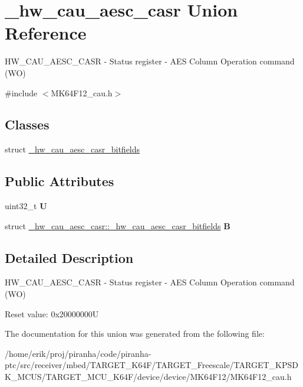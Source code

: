 \hypertarget{union__hw__cau__aesc__casr}{}\section{\+\_\+hw\+\_\+cau\+\_\+aesc\+\_\+casr Union Reference}
\label{union__hw__cau__aesc__casr}


H\+W\+\_\+\+C\+A\+U\+\_\+\+A\+E\+S\+C\+\_\+\+C\+A\+SR -\/ Status register -\/ A\+ES Column Operation command (WO)  




{\ttfamily \#include $<$M\+K64\+F12\+\_\+cau.\+h$>$}

\subsection*{Classes}
\begin{DoxyCompactItemize}
\item 
struct \hyperlink{struct__hw__cau__aesc__casr_1_1__hw__cau__aesc__casr__bitfields}{\+\_\+hw\+\_\+cau\+\_\+aesc\+\_\+casr\+\_\+bitfields}
\end{DoxyCompactItemize}
\subsection*{Public Attributes}
\begin{DoxyCompactItemize}
\item 
uint32\+\_\+t {\bfseries U}\hypertarget{union__hw__cau__aesc__casr_a70bdc55c3e888d7e8799d371283fb65f}{}\label{union__hw__cau__aesc__casr_a70bdc55c3e888d7e8799d371283fb65f}

\item 
struct \hyperlink{struct__hw__cau__aesc__casr_1_1__hw__cau__aesc__casr__bitfields}{\+\_\+hw\+\_\+cau\+\_\+aesc\+\_\+casr\+::\+\_\+hw\+\_\+cau\+\_\+aesc\+\_\+casr\+\_\+bitfields} {\bfseries B}\hypertarget{union__hw__cau__aesc__casr_a8c7dfcf4619366c8be5b47afdc1adeca}{}\label{union__hw__cau__aesc__casr_a8c7dfcf4619366c8be5b47afdc1adeca}

\end{DoxyCompactItemize}


\subsection{Detailed Description}
H\+W\+\_\+\+C\+A\+U\+\_\+\+A\+E\+S\+C\+\_\+\+C\+A\+SR -\/ Status register -\/ A\+ES Column Operation command (WO) 

Reset value\+: 0x20000000U 

The documentation for this union was generated from the following file\+:\begin{DoxyCompactItemize}
\item 
/home/erik/proj/piranha/code/piranha-\/ptc/src/receiver/mbed/\+T\+A\+R\+G\+E\+T\+\_\+\+K64\+F/\+T\+A\+R\+G\+E\+T\+\_\+\+Freescale/\+T\+A\+R\+G\+E\+T\+\_\+\+K\+P\+S\+D\+K\+\_\+\+M\+C\+U\+S/\+T\+A\+R\+G\+E\+T\+\_\+\+M\+C\+U\+\_\+\+K64\+F/device/device/\+M\+K64\+F12/M\+K64\+F12\+\_\+cau.\+h\end{DoxyCompactItemize}
